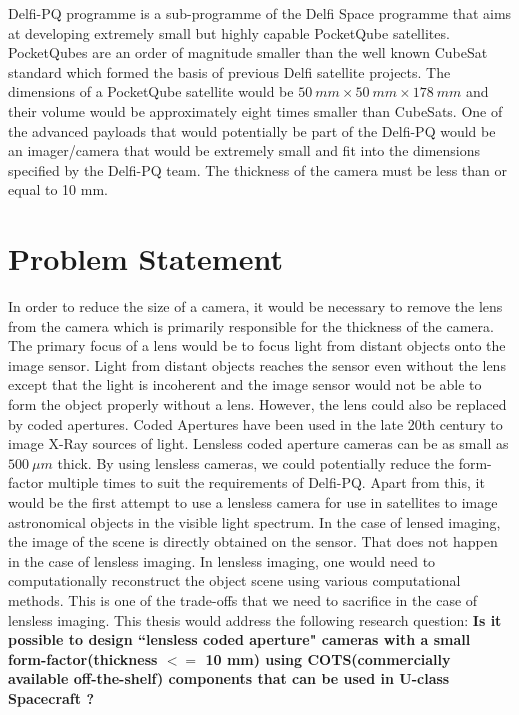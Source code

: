 Delfi-PQ programme is a sub-programme of the Delfi Space programme that aims at developing extremely small but highly capable PocketQube satellites. PocketQubes are an order of magnitude smaller than the well known CubeSat standard which formed the basis of previous Delfi satellite projects. The dimensions of a PocketQube satellite would be $50 \ mm \times 50 \ mm \times 178\ mm$ and their volume would be approximately eight times smaller than CubeSats. One of the advanced payloads that would potentially be part of the Delfi-PQ would be an imager/camera that would be extremely small and fit into the dimensions specified by the Delfi-PQ team. The thickness of the camera must be less than or equal to 10 mm.
 
 
\section{Problem Statement}
In order to reduce the size of a camera, it would be necessary to remove the lens from the camera which is primarily responsible for the thickness of the camera. The primary focus of a lens would be to focus light from distant objects onto the image sensor. Light from distant objects reaches the sensor even without the lens except that the light is incoherent and the image sensor would not be able to form the object properly without a lens. However, the lens could also be replaced by coded apertures. Coded Apertures have been used in the late 20th century to image X-Ray sources of light. Lensless coded aperture cameras can be as small as $500 \ \mu m$ thick\cite{Flatcam}. By using lensless cameras, we could potentially reduce the form-factor multiple times to suit the requirements of Delfi-PQ. Apart from this, it would be the first attempt to use a lensless camera for use in satellites to image astronomical objects in the visible light spectrum. In the case of lensed imaging, the image of the scene is directly obtained on the sensor. That does not happen in the case of lensless imaging. In lensless imaging, one would need to computationally reconstruct the object scene using various computational methods. This is one of the trade-offs that we need to sacrifice in the case of lensless imaging.
This thesis would address the following research question:
\textbf{Is it possible to design ``lensless coded aperture" cameras with a small form-factor(thickness $<=$ 10 mm) using COTS(commercially available off-the-shelf) components that can be used in U-class Spacecraft ?}

